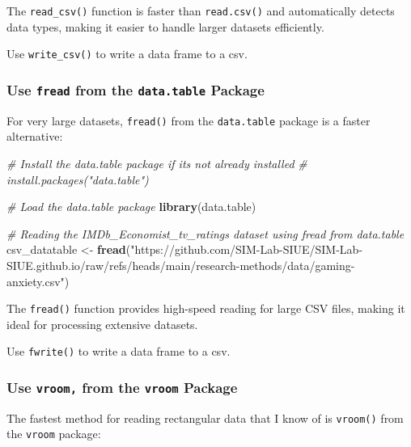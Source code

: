 \documentclass[
]{book}
\newenvironment{Shaded}{\begin{snugshade}}{\end{snugshade}}
\newcommand{\CommentTok}[1]{\textcolor[rgb]{0.56,0.35,0.01}{\textit{#1}}}
\newcommand{\FunctionTok}[1]{\textcolor[rgb]{0.13,0.29,0.53}{\textbf{#1}}}
\newcommand{\NormalTok}[1]{#1}
\newcommand{\OtherTok}[1]{\textcolor[rgb]{0.56,0.35,0.01}{#1}}
\newcommand{\StringTok}[1]{\textcolor[rgb]{0.31,0.60,0.02}{#1}}
\begin{document}
The \texttt{read\_csv()} function is faster than \texttt{read.csv()} and automatically detects data types, making it easier to handle larger datasets efficiently.

Use \texttt{write\_csv()} to write a data frame to a csv.

\subsubsection*{\texorpdfstring{Use \texttt{fread} from the \texttt{data.table} Package}{Use fread from the data.table Package}}\label{use-fread-from-the-data.table-package}

For very large datasets, \texttt{fread()} from the \texttt{data.table} package is a faster alternative:

\begin{Shaded}
\begin{Highlighting}[]
\CommentTok{\# Install the data.table package if it\textquotesingle{}s not already installed}
\CommentTok{\# install.packages("data.table")}

\CommentTok{\# Load the data.table package}
\FunctionTok{library}\NormalTok{(data.table)}

\CommentTok{\# Reading the IMDb\_Economist\_tv\_ratings dataset using fread from data.table}
\NormalTok{csv\_datatable }\OtherTok{\textless{}{-}} \FunctionTok{fread}\NormalTok{(}\StringTok{"https://github.com/SIM{-}Lab{-}SIUE/SIM{-}Lab{-}SIUE.github.io/raw/refs/heads/main/research{-}methods/data/gaming{-}anxiety.csv"}\NormalTok{)}
\end{Highlighting}
\end{Shaded}

The \texttt{fread()} function provides high-speed reading for large CSV files, making it ideal for processing extensive datasets.

Use \texttt{fwrite()} to write a data frame to a csv.

\subsubsection*{\texorpdfstring{Use \texttt{vroom,} from the \texttt{vroom} Package}{Use vroom, from the vroom Package}}\label{use-vroom-from-the-vroom-package}

The fastest method for reading rectangular data that I know of is \texttt{vroom()} from the \texttt{vroom} package:
\end{document}
